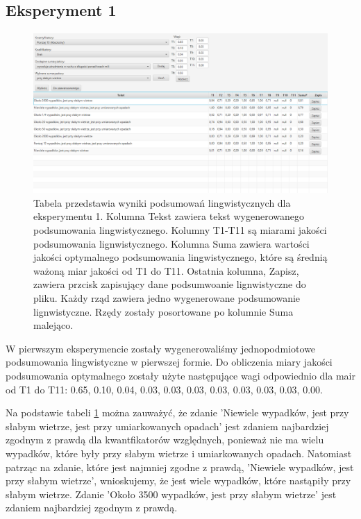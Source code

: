 \documentclass{classrep}
\begin{document}
\subsection{Eksperyment 1}
\label{section:ex1}
\begin{figure}[h!]
 \centering
 \includegraphics[width=15cm]{ex1.png}
 \vspace{-0.3cm}
 \caption{Tabela przedstawia wyniki podsumowań lingwistycznych dla eksperymentu 1. Kolumna Tekst zawiera tekst wygenerowanego podsumowania lingwistycznego. Kolumny T1-T11 są miarami jakości podsumowania lignwistycznego\cite{niewiadomski19}. Kolumna Suma zawiera wartości jakości optymalnego podsumowania lingwistycznego, które są średnią ważoną miar jakości od T1 do T11. Ostatnia kolumna, Zapisz, zawiera przcisk zapisujący dane podsumwoanie lignwistyczne do pliku. Każdy rząd zawiera jedno wygenerowane podsumowanie lignwistyczne. Rzędy zostały posortowane po kolumnie Suma malejąco.  }
 \label{ex1}
\end{figure}

W pierwszym eksperymencie zostały wygenerowaliśmy jednopodmiotowe podsumowania lingwistyczne w pierwszej formie. Do obliczenia miary jakości podsumowania optymalnego zostały użyte następujące wagi odpowiednio dla mair od T1 do T11: 0.65, 0.10, 0.04, 0.03, 0.03, 0.03, 0.03, 0.03, 0.03, 0.03, 0.00. 

Na podstawie tabeli \ref{ex1} można zauważyć, że zdanie 'Niewiele wypadków, jest przy słabym wietrze, jest przy umiarkowanych opadach' jest zdaniem najbardziej zgodnym z prawdą dla kwantfikatorów względnych, ponieważ nie ma wielu wypadków, które były przy słabym wietrze i umiarkowanych opadach. Natomiast patrząc na zdanie, które jest najmniej zgodne z prawdą, 'Niewiele wypadków, jest przy słabym wietrze', wnioskujemy, że jest wiele wypadków, które nastąpiły przy słabym wietrze. Zdanie 'Około 3500 wypadków, jest przy słabym wietrze' jest zdaniem najbardziej zgodnym z prawdą. 
\end{document}
